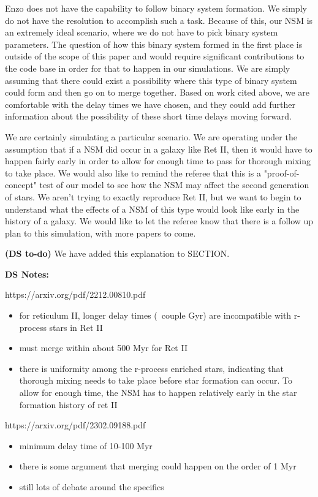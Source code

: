\documentclass[11pt]{article}
\begin{document}
Enzo does not have the capability to follow binary system formation. We simply do not have the resolution to accomplish such a task. Because of this, our NSM is an extremely ideal scenario, where we do not have to pick binary system parameters. The question of how this binary system formed in the first place is outside of the scope of this paper and would require significant contributions to the code base in order for that to happen in our simulations. We are simply assuming that there could exist a possibility where this type of binary system could form and then go on to merge together. Based on work cited above, we are comfortable with the delay times we have chosen, and they could add further information about the possibility of these short time delays moving forward.

We are certainly simulating a particular scenario. We are operating under the assumption that if a NSM did occur in a galaxy like Ret II, then it would have to happen fairly early in order to allow for enough time to pass for thorough mixing to take place. We would also like to remind the referee that this is a "proof-of-concept" test of our model to see how the NSM may affect the second generation of stars. We aren't trying to exactly reproduce Ret II, but we want to begin to understand what the effects of a NSM of this type would look like early in the history of a galaxy. We would like to let the referee know that there is a follow up plan to this simulation, with more papers to come.

\textbf{(DS to-do)} We have added this explanation to SECTION.

\textbf{DS Notes:}

https://arxiv.org/pdf/2212.00810.pdf
\begin{itemize}
    \item for reticulum II, longer delay times (~couple Gyr) are incompatible with r-process stars in Ret II
    \item must merge within about 500 Myr for Ret II
    \item there is uniformity among the r-process enriched stars, indicating that thorough mixing needs to take place before star formation can occur. To allow for enough time, the NSM has to happen relatively early in the star formation history of ret II
\end{itemize}

https://arxiv.org/pdf/2302.09188.pdf
\begin{itemize}
    \item minimum delay time of 10-100 Myr
    \item there is some argument that merging could happen on the order of 1 Myr
    \item still lots of debate around the specifics
\end{itemize}
\end{document}
